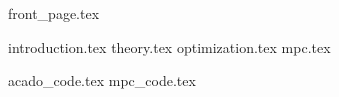 \documentclass{report}
\numberwithin{equation}{chapter}
\begin{document}
{front_page.tex}

\tableofcontents
\newpage

\pagestyle{fancy}

{introduction.tex}
{theory.tex}
{optimization.tex}
{mpc.tex}

\begin{appendices}
{acado_code.tex}
{mpc_code.tex}
\end{appendices}


\newpage


{}
\end{document}

